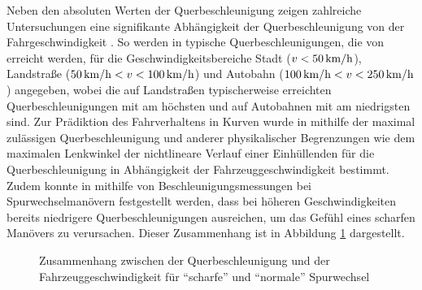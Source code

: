 Neben den absoluten Werten der Querbeschleunigung zeigen zahlreiche Untersuchungen eine signifikante Abhängigkeit der Querbeschleunigung von der Fahrgeschwindigkeit \cite{Dragon.2008,Reymond.2001,Schimmelpfennig.1985,Xu.2015}. So werden in \cite{Dragon.2008} typische Querbeschleunigungen, die von  erreicht werden, für die Geschwindigkeitsbereiche Stadt ($v<50\,\mathrm{km/h}$), Landstraße ($50\,\mathrm{km/h}<v<100\,\mathrm{km/h}$) und Autobahn ($100\,\mathrm{km/h}<v<250\,\mathrm{km/h}$) angegeben, wobei die auf Landstraßen typischerweise erreichten Querbeschleunigungen mit  am höchsten und auf Autobahnen mit  am niedrigsten sind. Zur Prädiktion des Fahrverhaltens in Kurven wurde in \cite{Reymond.2001} mithilfe der maximal zulässigen Querbeschleunigung und anderer physikalischer Begrenzungen wie dem maximalen Lenkwinkel der nichtlineare Verlauf einer Einhüllenden für die Querbeschleunigung in Abhängigkeit der Fahrzeuggeschwindigkeit bestimmt.
Zudem konnte in \cite{Schimmelpfennig.1985} mithilfe von Beschleunigungsmessungen bei Spurwechselmanövern festgestellt werden, dass bei höheren Geschwindigkeiten bereits niedrigere Querbeschleunigungen ausreichen, um das Gefühl eines scharfen Manövers zu verursachen. Dieser Zusammenhang ist in Abbildung \ref{fig:ay_v_schimmelpfennig} dargestellt.
\begin{figure}[h]
	\centering
	\fontsize{24pt}{16pt}\selectfont
	\caption{Zusammenhang zwischen der Querbeschleunigung und der Fahrzeuggeschwindigkeit für ``scharfe'' und ``normale'' Spurwechsel \cite{Schimmelpfennig.1985}}
	\label{fig:ay_v_schimmelpfennig}
\end{figure}

